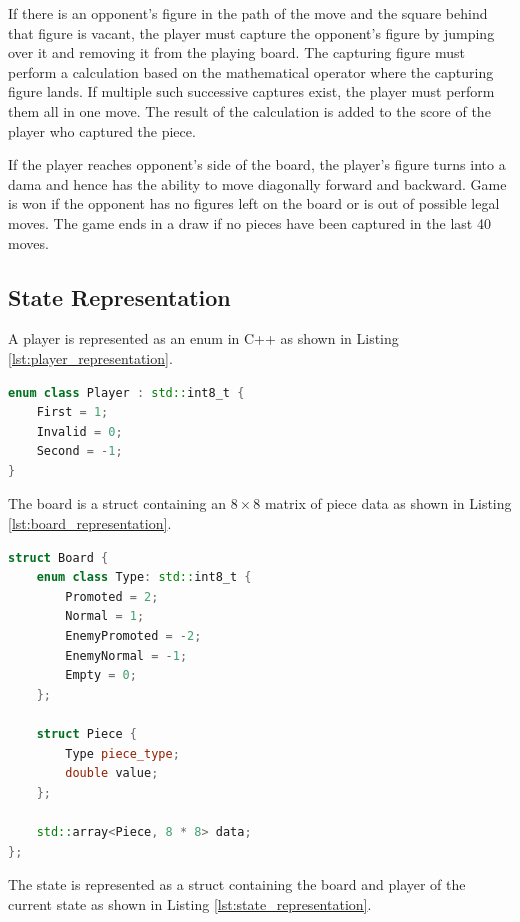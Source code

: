 If there is an opponent's figure in the path of the move and the square behind that figure is vacant, the player must capture the opponent's figure by jumping over it and removing it from the playing board. The capturing figure must perform a calculation based on the mathematical operator where the capturing figure lands. If multiple such successive captures exist, the player must perform them all in one move. The result of the calculation is added to the score of the player who captured the piece.

If the player reaches opponent’s side of the board, the player's figure turns into a dama and hence has the ability to move diagonally forward and backward. Game is won if the opponent has no figures left on the board or is out of possible legal moves. The game ends in a draw if no pieces have been captured in the last 40 moves.

\subsection{State Representation}

A player is represented as an enum in C++ as shown in Listing \ref{lst:player_representation}.

\begin{lstlisting}[language=C++,captionpos=b,label={lst:player_representation},caption={Player Representation of Damath}]
enum class Player : std::int8_t {
    First = 1;
    Invalid = 0;
    Second = -1;
}
\end{lstlisting}

The board is a struct containing an $8 \times 8$ matrix of piece data as shown in Listing \ref{lst:board_representation}.

\begin{lstlisting}[language=C++,captionpos=b,label={lst:board_representation},caption={Board Representation of Damath}]
struct Board {
    enum class Type: std::int8_t {
        Promoted = 2;
        Normal = 1;
        EnemyPromoted = -2;
        EnemyNormal = -1;
        Empty = 0;
    };
    
    struct Piece {
        Type piece_type;    
        double value;
    };

    std::array<Piece, 8 * 8> data;
};
\end{lstlisting}

The state is represented as a struct containing the board and player of the current state as shown in Listing \ref{lst:state_representation}.


